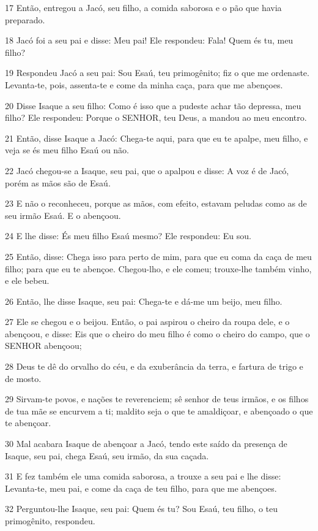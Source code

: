 \par 17 Então, entregou a Jacó, seu filho, a comida saborosa e o pão que havia preparado.
\par 18 Jacó foi a seu pai e disse: Meu pai! Ele respondeu: Fala! Quem és tu, meu filho?
\par 19 Respondeu Jacó a seu pai: Sou Esaú, teu primogênito; fiz o que me ordenaste. Levanta-te, pois, assenta-te e come da minha caça, para que me abençoes.
\par 20 Disse Isaque a seu filho: Como é isso que a pudeste achar tão depressa, meu filho? Ele respondeu: Porque o SENHOR, teu Deus, a mandou ao meu encontro.
\par 21 Então, disse Isaque a Jacó: Chega-te aqui, para que eu te apalpe, meu filho, e veja se és meu filho Esaú ou não.
\par 22 Jacó chegou-se a Isaque, seu pai, que o apalpou e disse: A voz é de Jacó, porém as mãos são de Esaú.
\par 23 E não o reconheceu, porque as mãos, com efeito, estavam peludas como as de seu irmão Esaú. E o abençoou.
\par 24 E lhe disse: És meu filho Esaú mesmo? Ele respondeu: Eu sou.
\par 25 Então, disse: Chega isso para perto de mim, para que eu coma da caça de meu filho; para que eu te abençoe. Chegou-lho, e ele comeu; trouxe-lhe também vinho, e ele bebeu.
\par 26 Então, lhe disse Isaque, seu pai: Chega-te e dá-me um beijo, meu filho.
\par 27 Ele se chegou e o beijou. Então, o pai aspirou o cheiro da roupa dele, e o abençoou, e disse: Eis que o cheiro do meu filho é como o cheiro do campo, que o SENHOR abençoou;
\par 28 Deus te dê do orvalho do céu, e da exuberância da terra, e fartura de trigo e de mosto.
\par 29 Sirvam-te povos, e nações te reverenciem; sê senhor de teus irmãos, e os filhos de tua mãe se encurvem a ti; maldito seja o que te amaldiçoar, e abençoado o que te abençoar.
\par 30 Mal acabara Isaque de abençoar a Jacó, tendo este saído da presença de Isaque, seu pai, chega Esaú, seu irmão, da sua caçada.
\par 31 E fez também ele uma comida saborosa, a trouxe a seu pai e lhe disse: Levanta-te, meu pai, e come da caça de teu filho, para que me abençoes.
\par 32 Perguntou-lhe Isaque, seu pai: Quem és tu? Sou Esaú, teu filho, o teu primogênito, respondeu.
